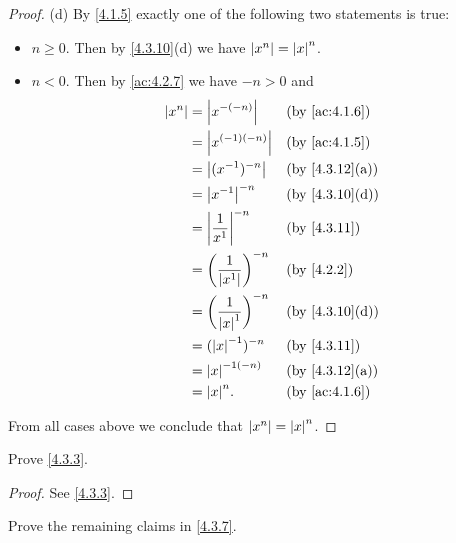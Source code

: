 \begin{proof}{(d)}
  By \cref{4.1.5} exactly one of the following two statements is true:
  \begin{itemize}
    \item \(n \geq 0\).
          Then by \cref{4.3.10}(d) we have \(\left\lvert x^n\right\rvert = \left\lvert x\right\rvert^n\).
    \item \(n < 0\).
          Then by \cref{ac:4.2.7} we have \(-n > 0\) and
          \begin{align*}
            \abs{x^n} & = \abs{x^{-(-n)}}                       &  & \by{ac:4.1.6}                \\
                      & = \abs{x^{(-1)(-n)}}                    &  & \by{ac:4.1.5}                \\
                      & = \abs{(x^{-1})^{-n}}                   &  & \text{(by \cref{4.3.12}(a))} \\
                      & = \abs{x^{-1}}^{-n}                     &  & \text{(by \cref{4.3.10}(d))} \\
                      & = \abs{\dfrac{1}{x^1}}^{-n}             &  & \by{4.3.11}                  \\
                      & = \bigg(\dfrac{1}{\abs{x^1}}\bigg)^{-n} &  & \by{4.2.2}                   \\
                      & = \bigg(\dfrac{1}{\abs{x}^1}\bigg)^{-n} &  & \text{(by \cref{4.3.10}(d))} \\
                      & = (\abs{x}^{-1})^{-n}                   &  & \by{4.3.11}                  \\
                      & = \abs{x}^{-1(-n)}                      &  & \text{(by \cref{4.3.12}(a))} \\
                      & = \abs{x}^n.                            &  & \by{ac:4.1.6}
          \end{align*}
  \end{itemize}
  From all cases above we conclude that \(\left\lvert x^n\right\rvert = \left\lvert x\right\rvert^n\).
\end{proof}

\exercisesection

\begin{ex}\label{ex:4.3.1}
  Prove \cref{4.3.3}.
\end{ex}

\begin{proof}
  See \cref{4.3.3}.
\end{proof}

\begin{ex}\label{ex:4.3.2}
  Prove the remaining claims in \cref{4.3.7}.
\end{ex}

